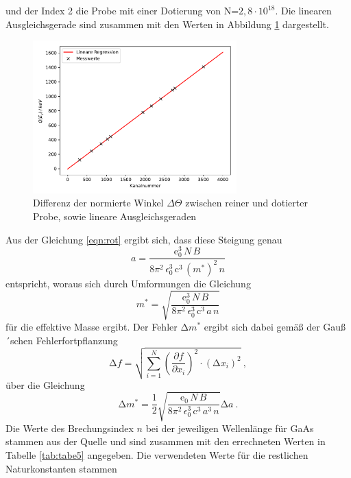 und der Index 2 die Probe mit einer Dotierung von N=$2,8\cdot10^{18}$.
Die linearen Ausgleichsgerade sind zusammen mit den Werten in Abbildung \ref{fig:plot3}
dargestellt. \\
\begin{figure}
  \centering
  \includegraphics[width=0.7\textwidth]{plot3.pdf}
  \caption{Differenz der normierte Winkel $\Delta \Theta$
  zwischen reiner und dotierter Probe, sowie lineare Ausgleichsgeraden}
  \label{fig:plot3}
\end{figure}
Aus der Gleichung \eqref{eqn:rot} ergibt sich, dass diese Steigung genau
\begin{equation}
  a=\frac{\text{e}_0^3\,N\,B}{8\pi^2\,\epsilon_0^3\,\text{c}^3\,(m^*)^2\,n}
\end{equation}
entspricht, woraus sich durch Umformungen die Gleichung
\begin{equation}
  m^*=\sqrt{\frac{\text{e}_0^3\,N\,B}{8\pi^2\,\epsilon_0^3\,\text{c}^3\,a\,n}}
\end{equation}
für die effektive Masse ergibt.
Der Fehler $\increment m^*$ ergibt sich dabei gemäß der Gauß´schen Fehlerfortpflanzung
\begin{equation}
  \increment f = \sqrt{ \sum_{i=1}^N \left( \frac{\partial f}{\partial x_i}\right)^2
  \cdot (\increment x_i)^2  } \: ,
  \label{eqn:gaus}
\end{equation}
über die Gleichung
\begin{equation}
  \increment m^*=\frac{1}{2}\sqrt{\frac{\text{e}_0\,N\,B}{8\pi^2\,\epsilon_0^3\,\text{c}^3\,a^3\,n}}\increment a \: .
\end{equation}
Die Werte des Brechungsindex $n$ bei der jeweiligen Wellenlänge für GaAs
stammen aus der Quelle \cite{online1} und sind zusammen mit den errechneten Werten in Tabelle
\ref{tab:tabe5}  angegeben. Die verwendeten Werte für die restlichen Naturkonstanten stammen
